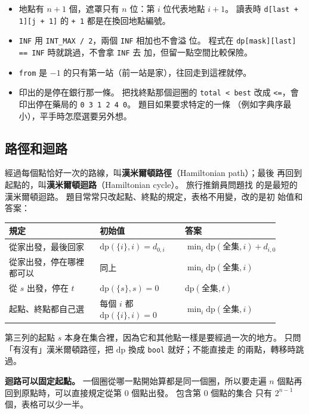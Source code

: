 \begin{itemize}
\item 地點有 $n + 1$ 個，遮罩只有 $n$ 位：第 $i$ 位代表地點 $i + 1$。 讀表時
\texttt{d[last + 1][j + 1]} 的 \texttt{+ 1} 都是在換回地點編號。
\item \texttt{INF} 用 \texttt{INT\_MAX / 2}，兩個 \texttt{INF} 相加也不會溢
位。 程式在 \texttt{dp[mask][last] == INF} 時就跳過，不會拿 \texttt{INF} 去
加，但留一點空間比較保險。
\item \texttt{from} 是 $-1$ 的只有第一站（前一站是家），往回走到這裡就停。
\item 印出的是停在銀行那一條。 把找終點那個迴圈的 \texttt{total < best} 改成
\texttt{<=}，會印出停在藥局的 \texttt{0 3 1 2 4 0}。 題目如果要求特定的一條
（例如字典序最小），平手時怎麼選要另外想。
\end{itemize}

\subsection{路徑和迴路}
\label{sec:bm-path}

經過每個點恰好一次的路線，叫\textbf{漢米爾頓路徑}（Hamiltonian path）；最後
再回到起點的，叫\textbf{漢米爾頓迴路}（Hamiltonian cycle）。 旅行推銷員問題找
的是最短的漢米爾頓迴路。 題目常常只改起點、終點的規定，表格不用變，改的是初
始值和答案：

\begin{center}
\begin{tabular}{p{0.32\linewidth}p{0.3\linewidth}p{0.28\linewidth}}
\toprule
規定 & 初始值 & 答案 \\
\midrule
從家出發，最後回家 & $\mathrm{dp}(\{i\}, i) = d_{0,i}$ & $\min_i \mathrm{dp}(\text{全集}, i) + d_{i,0}$ \\
從家出發，停在哪裡都可以 & 同上 & $\min_i \mathrm{dp}(\text{全集}, i)$ \\
從 $s$ 出發，停在 $t$ & $\mathrm{dp}(\{s\}, s) = 0$ & $\mathrm{dp}(\text{全集}, t)$ \\
起點、終點都自己選 & 每個 $i$ 都 $\mathrm{dp}(\{i\}, i) = 0$ & $\min_i \mathrm{dp}(\text{全集}, i)$ \\
\bottomrule
\end{tabular}
\end{center}

第三列的起點 $s$ 本身在集合裡，因為它和其他點一樣是要經過一次的地方。 只問
「有沒有」漢米爾頓路徑，把 $\mathrm{dp}$ 換成 \texttt{bool} 就好；不能直接走
的兩點，轉移時跳過。

\textbf{迴路可以固定起點。} 一個圈從哪一點開始算都是同一個圈，所以要走遍
$n$ 個點再回到原點時，可以直接規定從第 $0$ 個點出發。 包含第 $0$ 個點的集合
只有 $2^{n - 1}$ 個，表格可以少一半。

